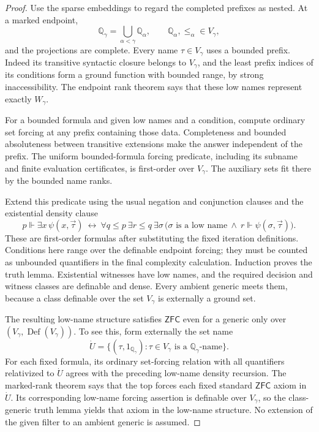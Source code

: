 \documentclass[11pt,a4paper]{amsart}
\newcommand{\ZFC}{\mathsf{ZFC}}
\theoremstyle{plain}
\theoremstyle{definition}
\theoremstyle{remark}
\begin{document}
\begin{proof}
Use the sparse embeddings to regard the completed prefixes as nested.
At a marked endpoint,
\[
\mathbb Q_\gamma=\bigcup_{\alpha<\gamma}\mathbb Q_\alpha,
\qquad \mathbb Q_\alpha,\leq_\alpha\in V_\gamma,
\]
and the projections are complete.
Every name $\tau\in V_\gamma$ uses a bounded prefix.
Indeed its transitive syntactic closure belongs to $V_\gamma$,
and the least prefix indices of its conditions form a ground function
with bounded range, by strong inaccessibility.
The endpoint rank theorem says that these low names represent exactly
$W_\gamma$.

For a bounded formula and given low names and a condition, compute
ordinary set forcing at any prefix containing those data.
Completeness and bounded absoluteness between transitive extensions
make the answer independent of the prefix.
The uniform bounded-formula forcing predicate, including its
subname and finite evaluation certificates, is first-order over
$V_\gamma$.  The auxiliary sets fit there by the bounded name ranks.

Extend this predicate using the usual negation and conjunction
clauses and the existential density clause
\[
p\Vdash\exists x\,\psi(x,\vec\tau)
\ \longleftrightarrow\
\forall q\leq p\ \exists r\leq q\
\exists\sigma\,
\bigl(\sigma\text{ is a low name}\ \land\
r\Vdash\psi(\sigma,\vec\tau)\bigr).
\]
These are first-order formulas after substituting the fixed iteration
definitions.  Conditions here range over the definable endpoint
forcing; they must be counted as unbounded quantifiers in the final
complexity calculation.
Induction proves the truth lemma.  Existential witnesses have low
names, and the required decision and witness classes are definable
and dense.  Every ambient generic meets them, because a class
definable over the set $V_\gamma$ is externally a ground set.

The resulting low-name structure satisfies $\ZFC$ even for a generic
only over $(V_\gamma,\operatorname{Def}(V_\gamma))$.
To see this, form externally the set name
\[
\dot U=\{(\tau,1_{\mathbb Q_\gamma}):
      \tau\in V_\gamma\text{ is a }\mathbb Q_\gamma\text{-name}\}.
\]
For each fixed formula, its ordinary set-forcing relation with all
quantifiers relativized to $\dot U$ agrees with the preceding
low-name density recursion.  The marked-rank theorem says that the
top forces each fixed standard $\ZFC$ axiom in $\dot U$.
Its corresponding low-name forcing assertion is definable over
$V_\gamma$, so the class-generic truth lemma yields that axiom in
the low-name structure.  No extension of the given filter to an
ambient generic is assumed.


\end{proof}
\end{document}
